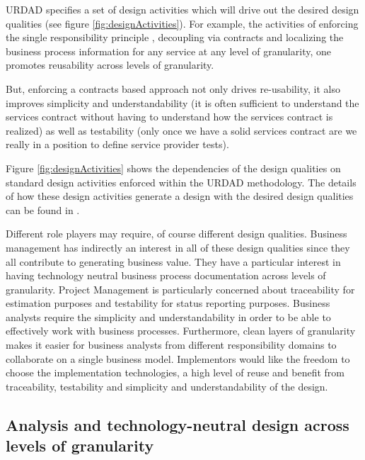 \documentclass[reviewcopy]{elsart}
\begin{document}
URDAD specifies a set of design activities which will drive out the desired
design qualities (see figure \ref{fig:designActivities}).
For example, the activities of enforcing the single
responsibility principle \cite{wirfs-brock:objectDesign,
wirfs-brock:responsibilityDrivenApproach}, decoupling via contracts
\cite{meyer:designByContract} and localizing the business process information
for any service at any level of granularity, one promotes reusability across
levels of granularity.

But, enforcing a contracts based approach not only drives re-usability, it also
improves simplicity and understandability (it is often sufficient to understand the
services contract without having to understand how the services contract is
realized) as well as testability (only once we have a solid services contract are we
really in a position to define service provider tests).

Figure \ref{fig:designActivities} shows the dependencies of the design qualities on
standard design activities enforced within the URDAD methodology. The details of
how these design activities generate a design with the desired design qualities
can be found in \cite{solms:urdad}.

Different role players may require, of course different design qualities. Business
management has indirectly an interest in all of these design qualities since they
all contribute to generating business value. They have a particular interest in
having technology neutral business process documentation across levels of granularity.
Project Management is particularly
concerned about traceability for estimation purposes and testability for status
reporting purposes. Business analysts require the simplicity and understandability
in order to be able to effectively work with business processes. Furthermore, clean
layers of granularity makes it easier for business analysts from different responsibility
domains to collaborate on a single business model. Implementors would like the freedom
to choose the implementation technologies, a high level of reuse and benefit from traceability,
testability and simplicity and understandability of the design.


\subsection{Analysis and technology-neutral design across levels of granularity}
\end{document}
